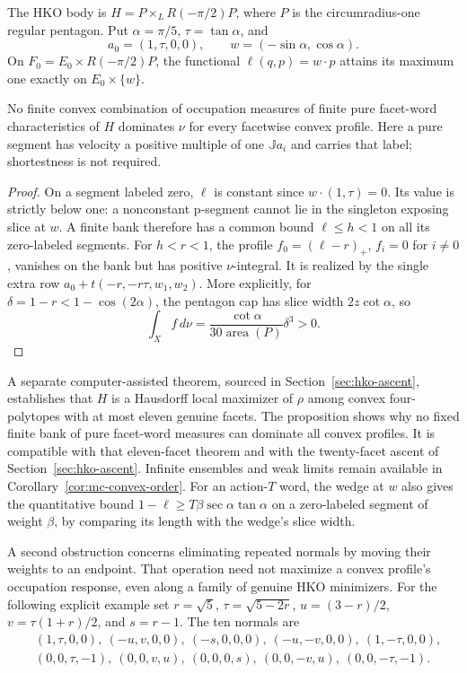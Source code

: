 The HKO body is $H=P\times_LR(-\pi/2)P$, where $P$ is the circumradius-one
regular pentagon. Put $\alpha=\pi/5$, $\tau=\tan\alpha$, and
\[
 a_0=(1,\tau,0,0),\qquad w=(-\sin\alpha,\cos\alpha).
\]
On $F_0=E_0\times R(-\pi/2)P$, the functional $\ell(q,p)=w\cdot p$
attains its maximum one exactly on $E_0\times\{w\}$.

\begin{proposition}
No finite convex combination of occupation measures of finite pure
facet-word characteristics of $H$ dominates $\nu$ for every facetwise convex
profile. Here a pure segment has velocity a positive multiple of one
$\mathbb{J}a_i$ and carries that label; shortestness is not required.
\end{proposition}
\begin{proof}
On a segment labeled zero, $\ell$ is constant since
$w\cdot(1,\tau)=0$. Its value is strictly below one: a nonconstant
p-segment cannot lie in the singleton exposing slice at $w$.
A finite bank therefore has a common bound $\ell\leq h<1$ on all its
zero-labeled segments. For $h<r<1$, the profile
$f_0=(\ell-r)_+$, $f_i=0$ for $i\ne0$, vanishes on the bank but has
positive $\nu$-integral. It is realized by the single extra row
$a_0+t(-r,-r\tau,w_1,w_2)$.
More explicitly, for $\delta=1-r<1-\cos(2\alpha)$, the pentagon cap
has slice width $2z\cot\alpha$, so
\[
 \int_Xf\,d\nu=\frac{\cot\alpha}{30\operatorname{area}(P)}\delta^3>0.
\]
\end{proof}

A separate computer-assisted theorem, sourced in
Section~\ref{sec:hko-ascent}, establishes that $H$ is a Hausdorff local
maximizer of $\rho$ among convex four-polytopes with at most eleven
genuine facets.
The proposition shows why no fixed finite bank of pure facet-word measures
can dominate all convex profiles. It is compatible with that eleven-facet
theorem and with the twenty-facet ascent of Section~\ref{sec:hko-ascent}.
Infinite ensembles and weak limits remain available in
Corollary~\ref{cor:mc-convex-order}.
For an action-$T$ word, the wedge at $w$ also gives the quantitative bound
$1-\ell\geq T\beta\sec\alpha\tan\alpha$ on a zero-labeled segment of
weight $\beta$, by comparing its length with the wedge's slice width.

A second obstruction concerns eliminating repeated normals by moving their
weights to an endpoint. That operation need not maximize a convex profile's
occupation response, even along a family of genuine HKO minimizers.
For the following explicit example set $r=\sqrt5$, $\tau=\sqrt{5-2r}$,
$u=(3-r)/2$, $v=\tau(1+r)/2$, and $s=r-1$. The ten normals are
\[
\begin{split}
 &(1,\tau,0,0),\ (-u,v,0,0),\ (-s,0,0,0),\ (-u,-v,0,0),\ (1,-\tau,0,0),\\
 &(0,0,\tau,-1),\ (0,0,v,u),\ (0,0,0,s),\ (0,0,-v,u),\ (0,0,-\tau,-1).
\end{split}
\]

